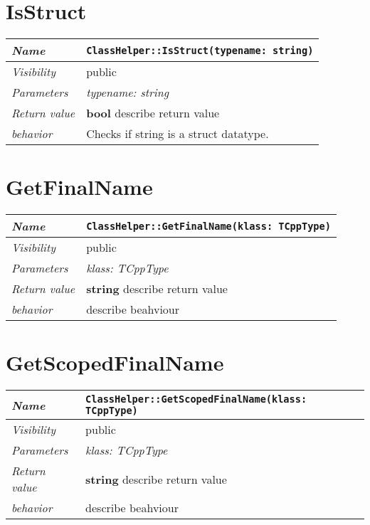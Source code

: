  \section{IsStruct}
\begin{longtable}{p{3cm} @{\hskip 1cm} p{12cm}}
 \hline
\textit{Name} & \texttt{ClassHelper::IsStruct(typename: string)}\\
\hline
 \textit{Visibility} & public\\
\hline
\textit{Parameters} & \textit{typename: string}\\
\hline
\textit{Return value} & \textbf{ bool} describe return value\\
  \hline
 \textit{behavior} & Checks if string is a struct datatype. \\
\hline
\end{longtable} \pagebreak
 \section{GetFinalName}
\begin{longtable}{p{3cm} @{\hskip 1cm} p{12cm}}
 \hline
\textit{Name} & \texttt{ClassHelper::GetFinalName(klass: TCppType)}\\
\hline
 \textit{Visibility} & public\\
\hline
\textit{Parameters} & \textit{klass: TCppType}\\
\hline
\textit{Return value} & \textbf{ string} describe return value\\
  \hline
 \textit{behavior} & describe beahviour \\
\hline
\end{longtable} \pagebreak
 \section{GetScopedFinalName}
\begin{longtable}{p{3cm} @{\hskip 1cm} p{12cm}}
 \hline
\textit{Name} & \texttt{ClassHelper::GetScopedFinalName(klass: TCppType)}\\
\hline
 \textit{Visibility} & public\\
\hline
\textit{Parameters} & \textit{klass: TCppType}\\
\hline
\textit{Return value} & \textbf{ string} describe return value\\
  \hline
 \textit{behavior} & describe beahviour \\
\hline
\end{longtable} \pagebreak
